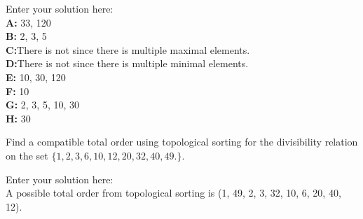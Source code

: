 \documentclass[10pt]{exam}
\begin{document}
\begin{questions}

\begin{solution}
    Enter your solution here:\\
    \textbf{A:} 33, 120\\
    \textbf{B:} 2, 3, 5\\
    \textbf{C:}There is not since there is multiple maximal elements.\\
    \textbf{D:}There is not since there is multiple minimal elements.\\
    \textbf{E:} 10, 30, 120\\
    \textbf{F:} 10\\
    \textbf{G:} 2, 3, 5, 10, 30\\
    \textbf{H:} 30\\
\end{solution}

\question[4] Find a compatible total order using topological sorting for the divisibility relation on the set $\{1, 2, 3, 6, 10, 12, 20, 32, 40, 49.\}$.

\begin{solution}
    Enter your solution here:\\
    A possible total order from topological sorting is (1, 49, 2, 3, 32, 10, 6, 20, 40, 12).
\end{solution}
\end{questions}
\end{document}
